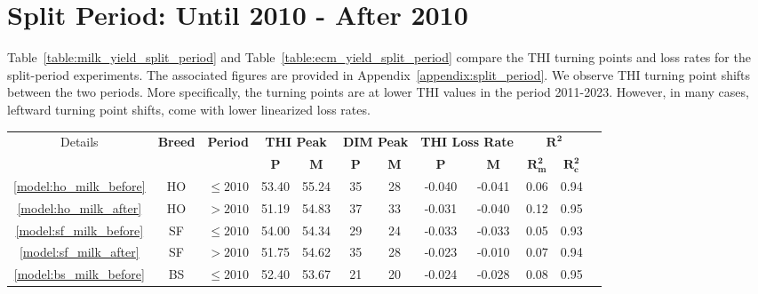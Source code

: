 \newpage

\section{Split Period: Until 2010 - After 2010}\label{sec:split_period}
Table~\ref{table:milk_yield_split_period} and Table~\ref{table:ecm_yield_split_period} compare the THI turning points and loss rates for the split-period experiments. The associated figures are provided in Appendix~\ref{appendix:split_period}. We observe THI turning point shifts between the two periods. More specifically, the turning points are at lower THI values in the period 2011-2023. However, in many cases, leftward turning point shifts, come with lower linearized loss rates.

\begin{table}[htbp]
    \centering
    \begin{tabular}{c c c c c c c c c c c c}
        \toprule
        \multirow{2}{*}{Details} &
        \multirow{2}{*}{\textbf{Breed}} &
        \multirow{2}{*}{\textbf{Period}} &
        \multicolumn{2}{c}{\textbf{THI Peak}} &
        \multicolumn{2}{c}{\textbf{DIM Peak}} &
        \multicolumn{2}{c}{\textbf{THI Loss Rate}} &
        \multicolumn{2}{c}{$\mathbf{R^2}$} \\
        \cmidrule(lr){4-5} \cmidrule(lr){6-7} \cmidrule(lr){8-9} \cmidrule(lr){10-11}
        & & &
        \textbf{P} & \textbf{M} &
        \textbf{P} & \textbf{M} &
        \textbf{P} & \textbf{M} &
        $\mathbf{R^2_m}$ & $\mathbf{R^2_c}$ & \\
        \hline
        \hline
        \textcolor{blue}{\ref{model:ho_milk_before}}& HO & $\leq 2010$ & 53.40 & 55.24 & 35 & 28 & -0.040 & -0.041 & 0.06 & 0.94\\
        \textcolor{blue}{\ref{model:ho_milk_after}}& HO & $>2010$ & 51.19 & 54.83 & 37 & 33 & -0.031 & -0.040 & 0.12 & 0.95\\
        \hline
        \textcolor{blue}{\ref{model:sf_milk_before}}& SF & $\leq 2010$ & 54.00 & 54.34 & 29 & 24 & -0.033 & -0.033 & 0.05 & 0.93\\
        \textcolor{blue}{\ref{model:sf_milk_after}}& SF & $>2010$ & 51.75 & 54.62 & 35 & 28 & -0.023 & -0.010 & 0.07 & 0.94\\
        \hline
        \textcolor{blue}{\ref{model:bs_milk_before}}& BS & $\leq 2010$ & 52.40 & 53.67 & 21 & 20 & -0.024 & -0.028 & 0.08 & 0.95\\

\end{tabular}
\end{table}
